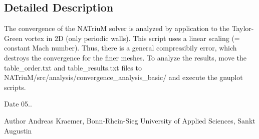 \subsection{Detailed Description}
The convergence of the N\-A\-Triu\-M solver is analyzed by application to the Taylor-\/\-Green vortex in 2\-D (only periodic walls). This script uses a linear scaling (= constant Mach number). Thus, there is a general compressibily error, which destroys the convergence for the finer meshes. To analyze the results, move the table\-\_\-order.\-txt and table\-\_\-results.\-txt files to N\-A\-Triu\-M/src/analysis/convergence\-\_\-analysis\-\_\-basic/ and execute the gnuplot scripts. \begin{DoxyDate}{Date}
05.. 
\end{DoxyDate}
\begin{DoxyAuthor}{Author}
Andreas Kraemer, Bonn-\/\-Rhein-\/\-Sieg University of Applied Sciences, Sankt Augustin 
\end{DoxyAuthor}
